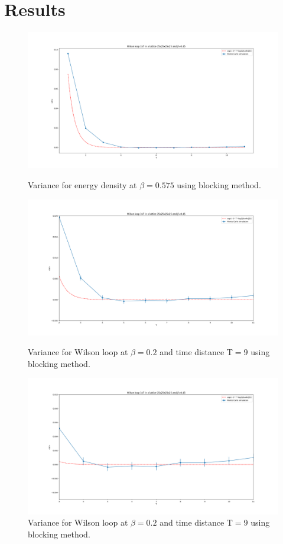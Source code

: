 \section{Results}
\begin{figure}[H]
    \centering
    \includegraphics[scale= 0.30]{WilsonLoop251.png}
    \caption{Variance for energy density at $\beta=0.575$ using blocking method.}
    \label{fig:Wilson1} 
    \includegraphics[scale= 0.30]{WilsonLoop252.png} 
    \caption{Variance for Wilson loop at $\beta=0.2$ and time distance T$=9$ using blocking method.}
    \label{fig:Wilson2} 
    \includegraphics[scale= 0.30]{WilsonLoop253.png} 
    \caption{Variance for Wilson loop at $\beta=0.2$ and time distance T$=9$ using blocking method.}
    \label{fig:Wilson3}        
\end{figure}